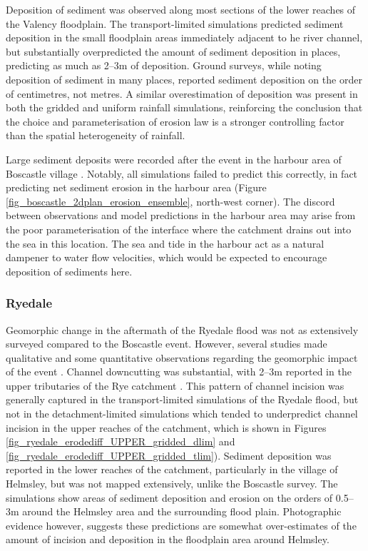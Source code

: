 Deposition of sediment was observed along most sections of the lower reaches of the Valency floodplain. The transport-limited simulations predicted sediment deposition in the small floodplain areas immediately adjacent to he river channel, but substantially overpredicted the amount of sediment deposition in places, predicting as much as 2--3m of deposition. Ground surveys, while noting deposition of sediment in many places, reported sediment deposition on the order of centimetres, not metres. A similar overestimation of deposition was present in both the gridded and uniform rainfall simulations, reinforcing the conclusion that the choice and parameterisation of erosion law is a stronger controlling factor than the spatial heterogeneity of rainfall.

Large sediment deposits were recorded after the event in the harbour area of Boscastle village \citep{wallingford2005flooding}. Notably, all simulations failed to predict this correctly, in fact predicting net sediment erosion in the harbour area (Figure \ref{fig_boscastle_2dplan_erosion_ensemble}, north-west corner). The discord between observations and model predictions in the harbour area may arise from the poor parameterisation of the interface where the catchment drains out into the sea in this location. The sea and tide in the harbour act as a natural dampener to water flow velocities, which would be expected to encourage deposition of sediments here.

\subsubsection{Ryedale}

Geomorphic change in the aftermath of the Ryedale flood was not as extensively surveyed compared to the Boscastle event. However, several studies made qualitative and some quantitative observations regarding the geomorphic impact of the event \citep{dong2006evaluation,wass2008investigation,hopkins2012knowledge}.
Channel downcutting was substantial, with 2--3m reported in the upper tributaries of the Rye catchment \citep{wass2008investigation,hopkins2012knowledge}. This pattern of channel incision was generally captured in the transport-limited simulations of the Ryedale flood, but not in the detachment-limited simulations which tended to underpredict channel incision in the upper reaches of the catchment, which is shown in Figures \ref{fig_ryedale_erodediff_UPPER_gridded_dlim} and \ref{fig_ryedale_erodediff_UPPER_gridded_tlim}). Sediment deposition was reported in the lower reaches of the catchment, particularly in the village of Helmsley, but was not mapped extensively, unlike the Boscastle survey. The simulations show areas of sediment deposition and erosion on the orders of 0.5--3m around the Helmsley area and the surrounding flood plain. Photographic evidence \citep{dong2006evaluation,hopkins2012knowledge} however, suggests these predictions are somewhat over-estimates of the amount of incision and deposition in the floodplain area around Helmsley.

